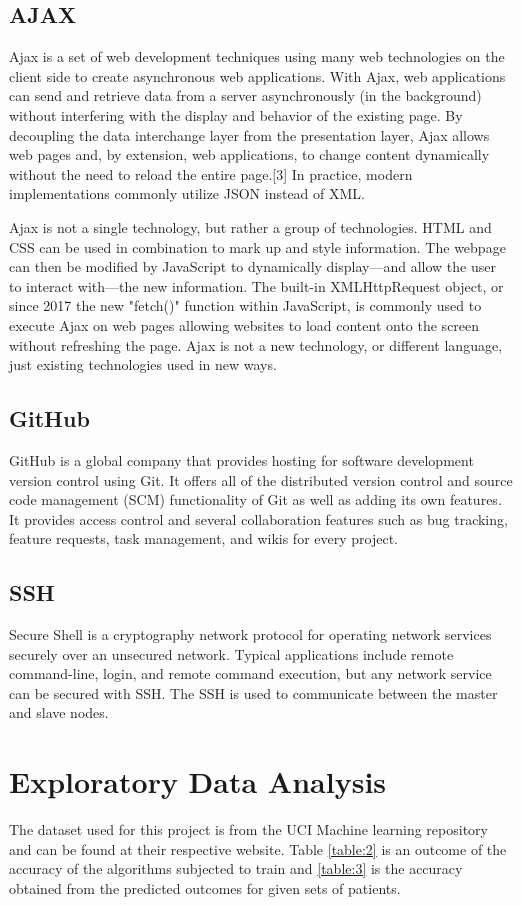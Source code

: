 \documentclass[12pt]{article}
\begin{document}
\subsection{AJAX}
Ajax is a set of web development techniques using many web technologies on the client side to create asynchronous web applications. With Ajax, web applications can send and retrieve data from a server asynchronously (in the background) without interfering with the display and behavior of the existing page. By decoupling the data interchange layer from the presentation layer, Ajax allows web pages and, by extension, web applications, to change content dynamically without the need to reload the entire page.[3] In practice, modern implementations commonly utilize JSON instead of XML.

Ajax is not a single technology, but rather a group of technologies. HTML and CSS can be used in combination to mark up and style information. The webpage can then be modified by JavaScript to dynamically display—and allow the user to interact with—the new information. The built-in XMLHttpRequest object, or since 2017 the new "fetch()" function within JavaScript, is commonly used to execute Ajax on web pages allowing websites to load content onto the screen without refreshing the page. Ajax is not a new technology, or different language, just existing technologies used in new ways.

\subsection{GitHub}
GitHub is a global company that provides hosting for software development version control using Git. It offers all of the distributed version control and source code management (SCM) functionality of Git as well as adding its own features. It provides access control and several collaboration features such as bug tracking, feature requests, task management, and wikis for every project.

\subsection{SSH}
Secure Shell is a cryptography network protocol for operating network services securely over an unsecured network. Typical applications include remote command-line, login, and remote command execution, but any network service can be secured with SSH. The SSH is used to communicate between the master and slave nodes.

\newpage
\section{Exploratory Data Analysis}
The dataset used for this project is from the UCI Machine learning repository and can be found at their respective website. Table \ref{table:2} is an outcome of the accuracy of the algorithms subjected to train and \ref{table:3} is the accuracy obtained from the predicted outcomes for given sets of patients.
\end{document}
